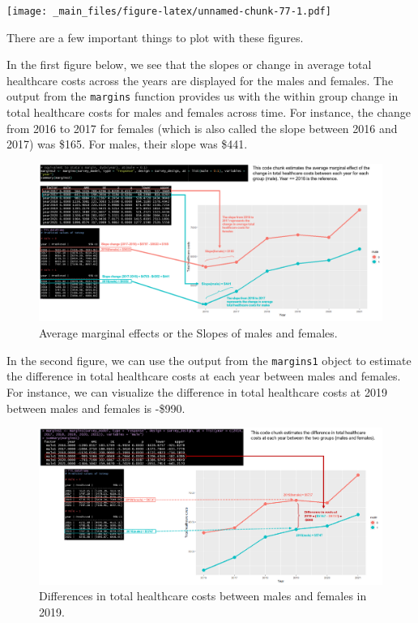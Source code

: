 \documentclass[
]{book}
\begin{document}
\texttt{[image: \_main\_files/figure-latex/unnamed-chunk-77-1.pdf]}

There are a few important things to plot with these figures.

In the first figure below, we see that the slopes or change in average total healthcare costs across the years are displayed for the males and females. The output from the \texttt{margins} function provides us with the within group change in total healthcare costs for males and females across time. For instance, the change from 2016 to 2017 for females (which is also called the slope between 2016 and 2017) was \$165. For males, their slope was \$441.

\begin{figure}
\includegraphics[width=1\linewidth]{Figure 5_2} \caption{Average marginal effects or the Slopes of males and females.}\label{fig:unnamed-chunk-78}
\end{figure}

In the second figure, we can use the output from the \texttt{margins1} object to estimate the difference in total healthcare costs at each year between males and females. For instance, we can visualize the difference in total healthcare costs at 2019 between males and females is -\$990.

\begin{figure}
\includegraphics[width=1\linewidth]{Figure 5_3} \caption{Differences in total healthcare costs between males and females in 2019.}\label{fig:unnamed-chunk-79}
\end{figure}
\end{document}
